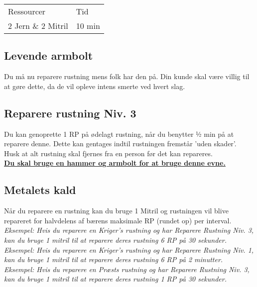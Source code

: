\begin{table}[H]
    \centering
    \begin{tabular}{|p{}|p{}|}
    \hline
    \rowcolor{cerulean!80}
    \multicolumn{2}{c}{Lås Niv. 3}\\
    \hline
    \rowcolor{cerulean!40}
         Ressourcer & Tid \\\hline
         2 Jern \& 2 Mitril & 10 min\\\hline
    \end{tabular}
\end{table}

\subsection{Levende armbolt}
Du må nu reparere rustning mens folk har den på. Din kunde skal være villig til at gøre dette, da de vil opleve intens smerte ved hvert slag.

\subsection{Reparere rustning Niv. 3}
Du kan genoprette 1 RP på ødelagt rustning, når du benytter ½ min på at reparere denne. Dette kan gentages indtil rustningen fremstår 'uden skader'.\\
Husk at alt rustning skal fjernes fra en person før det kan repareres.\\
\textbf{\underline{Du skal bruge en hammer og armbolt for at bruge denne evne.}}

\subsection{Metalets kald}
Når du reparere en rustning kan du bruge 1 Mitril og rustningen vil blive repareret for halvdelens af bærens maksimale RP (rundet op) per interval.\\
\textit{Eksempel: Hvis du reparere en Kriger's rustning og har Reparere Rustning Niv. 3, kan du bruge 1 mitril til at reparere deres rustning 6 RP på 30 sekunder.}\\
\textit{Eksempel: Hvis du reparere en Kriger's rustning og har Reparere Rustning Niv. 1, kan du bruge 1 mitril til at reparere deres rustning 6 RP på 2 minutter.}\\
\textit{Eksempel: Hvis du reparere en Præsts rustning og har Reparere Rustning Niv. 3, kan du bruge 1 mitril til at reparere deres rustning 1 RP på 30 sekunder.}